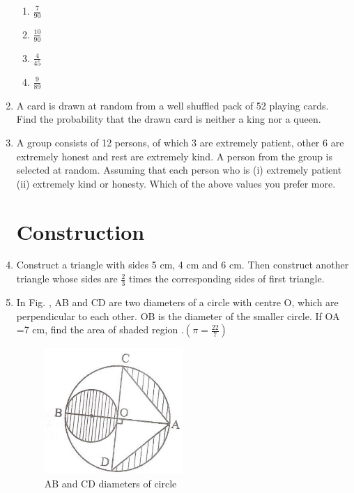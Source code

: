 \documentclass[10pt,-letter paper]{article}
\providecommand{\brak}[1]{\ensuremath{\left(#1\right)}}
\begin{document}
\begin{enumerate}
 \begin{enumerate}
    \item $\frac{7}{90}$\\
    \item $\frac{10}{90}$\\
    \item $\frac{4}{45}$\\
    \item $\frac{9}{89}$
 \end{enumerate}


\item A card is drawn at random from a well shuffled pack of 52 playing cards. Find the probability that the drawn card is neither a king nor a queen.

\item A group consists of 12 persons, of which 3 are extremely patient, other 6 are extremely honest and rest are extremely kind. A person from the group is selected at random. Assuming that each person who is (i) extremely patient (ii) extremely kind or honesty. Which of the above values you prefer more.
 \section{Construction}
\item Construct a triangle with sides 5 cm, 4 cm and 6 cm. Then construct another triangle whose sides are $\frac{2}{3}$ times the corresponding sides of first triangle.

\item In Fig. , AB and CD are two diameters of a circle with centre O, which are perpendicular to each other. OB is the diameter of the smaller circle. If OA =7 cm, find the area of shaded region .$\brak{ \pi = \frac{22}{7}}$\\
	\begin{figure}[H]
		\centering
\includegraphics[width=\columnwidth]{6.png}
\caption{AB and CD diameters of circle}
\label{fig:fig6}
	\end{figure}

\end{enumerate}
\end{document}
